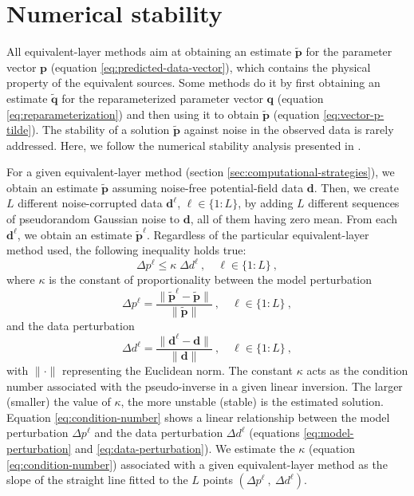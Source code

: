
\section{Numerical stability}

All equivalent-layer methods aim at obtaining an estimate $\tilde{\mathbf{p}}$ for the parameter vector 
$\mathbf{p}$ (equation \ref{eq:predicted-data-vector}), which contains the physical property of the equivalent sources.
Some methods do it by first obtaining an estimate $\tilde{\mathbf{q}}$ for the reparameterized parameter vector $\mathbf{q}$
(equation \ref{eq:reparameterization}) and then using it to obtain $\tilde{\mathbf{p}}$ (equation \ref{eq:vector-p-tilde}).
The stability of a solution $\tilde{\mathbf{p}}$ against noise in the observed data is rarely addressed.
Here, we follow the numerical stability analysis presented in \citet{siqueira-etal2017}.

For a given equivalent-layer method (section \ref{sec:computational-strategies}), we obtain an estimate 
$\tilde{\mathbf{p}}$ assuming noise-free potential-field data $\mathbf{d}$.
Then, we create $L$ different noise-corrupted data $\mathbf{d}^{\ell}$, $\ell \in \{1:L\}$, by adding 
$L$ different sequences of pseudorandom Gaussian noise to $\mathbf{d}$, all of them having zero mean. 
From each $\mathbf{d}^{\ell}$, we obtain an estimate $\tilde{\mathbf{p}}^{\ell}$. 
Regardless of the particular equivalent-layer method used, the following inequality \citep[][ p. 66]{aster_etal2019} 
holds true:
\begin{equation}
	\Delta p^{\ell} \leq \kappa \; \Delta d^{\ell} \: , \quad \ell \in \{1:L\} \: ,
	\label{eq:condition-number}
\end{equation}
where $\kappa$ is the constant of proportionality between the model perturbation
\begin{equation}
	\Delta p^{\ell} = \frac{\| \tilde{\mathbf{p}}^{\ell} - \tilde{\mathbf{p}} \|}{\| \tilde{\mathbf{p}} \|}
	\: , \quad \ell \in \{1:L\} \: ,
	\label{eq:model-perturbation}
\end{equation}
and the data perturbation
\begin{equation}
	\Delta d^{\ell} = \frac{\| \mathbf{d}^{\ell} - \mathbf{d} \|}{\| \mathbf{d} \|}
	\: , \quad \ell \in \{1:L\} \: ,
	\label{eq:data-perturbation}
\end{equation}
with $\| \cdot \|$ representing the Euclidean norm.
The constant $\kappa$ acts as the condition number associated with the pseudo-inverse in a given linear inversion.
The larger (smaller) the value of $\kappa$, the more unstable (stable) is the estimated solution.
Equation \ref{eq:condition-number} shows a linear relationship between the model perturbation $\Delta p^{\ell}$ and 
the data perturbation $\Delta d^{\ell}$ (equations \ref{eq:model-perturbation} and \ref{eq:data-perturbation}).
We estimate the $\kappa$ (equation \ref{eq:condition-number}) associated with a given 
equivalent-layer method as the slope of the straight line fitted to the $L$ points 
$\left( \Delta p^{\ell} \: , \: \Delta d^{\ell} \right)$.


